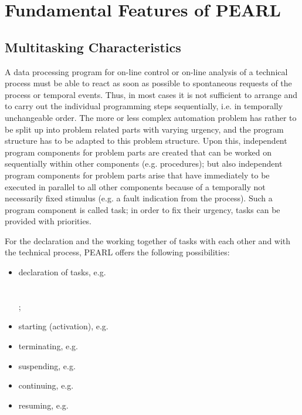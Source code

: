 \chapter{Fundamental Features of PEARL}   %

\section{Multitasking Characteristics} %


A data processing program for on-line control or on-line analysis of a
technical process must be able to react as soon as possible to
spontaneous requests of the process or temporal events. Thus, in most
cases it is not sufficient to arrange and to carry out the individual
programming steps sequentially, i.e. in temporally unchangeable order.
The more or less complex automation problem has rather to be split up into
problem related parts with varying urgency, and the program
structure has to be adapted to this problem structure. Upon this,
independent program components for problem parts are created that can be
worked on sequentially within other components (e.g. procedures);
but also independent program components for problem parts arise that
have immediately to be executed in parallel to all other components because
of a temporally not necessarily fixed stimulus (e.g. a fault indication
from the process). Such a program component is called
task; in order to fix their urgency, tasks can be provided with
priorities.

For the declaration and the working together of tasks with each other and
with the technical process, PEARL offers the following possibilities:

\begin{itemize}
\item declaration of tasks, e.g.\\
  \\
\\
;
\item starting (activation), e.g.\\
\item terminating, e.g.\\
\item suspending, e.g.\\
\item continuing, e.g.\\
\item resuming, e.g.\\
        \code{;}
\end{itemize}

